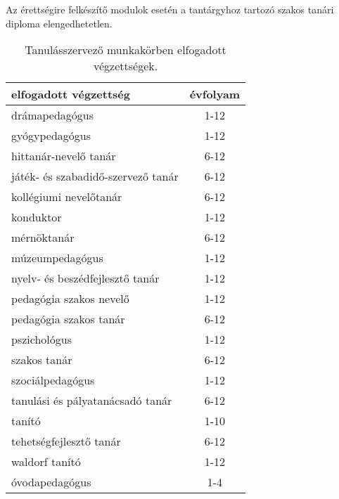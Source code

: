 Az érettségire felkészítő modulok esetén a tantárgyhoz tartozó szakos tanári
diploma elengedhetetlen.

\begin{table}[h]
    \begin{tabular}{l | c}
        \textbf{elfogadott végzettség}     & \textbf{évfolyam}
        \\ \hline \hline
        drámapedagógus                     & 1-12              \\ \hline
        gyógypedagógus                     & 1-12              \\ \hline
        hittanár-nevelő tanár              & 6-12              \\ \hline
        játék- és szabadidő-szervező tanár & 6-12              \\ \hline
        kollégiumi nevelőtanár             & 6-12              \\ \hline
        konduktor                          & 1-12              \\ \hline
        mérnöktanár                        & 6-12              \\ \hline
        múzeumpedagógus                    & 1-12              \\ \hline
        nyelv- és beszédfejlesztő tanár    & 1-12              \\ \hline
        pedagógia szakos nevelő            & 1-12              \\ \hline
        pedagógia szakos tanár             & 6-12              \\ \hline
        pszichológus                       & 1-12              \\ \hline
        szakos tanár                       & 6-12              \\ \hline
        szociálpedagógus                   & 1-12              \\ \hline
        tanulási és pályatanácsadó tanár   & 6-12              \\ \hline
        tanító                             & 1-10              \\ \hline
        tehetségfejlesztő tanár            & 6-12              \\ \hline
        waldorf tanító                     & 1-12              \\ \hline
        óvodapedagógus                     & 1-4               \\ \hline
    \end{tabular}
    \caption{Tanulásszervező munkakörben elfogadott végzettségek.}
    \label{tbl:vegzettsegek}
\end{table}

